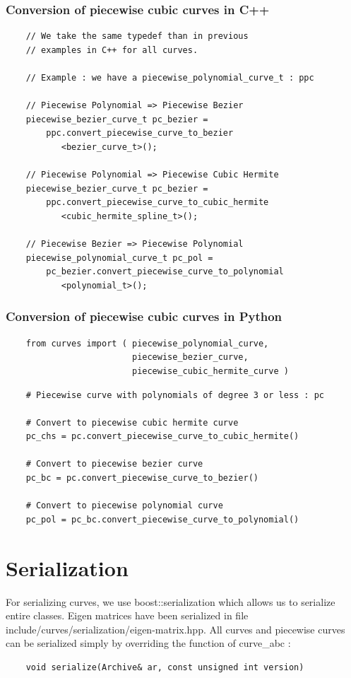 \documentclass{article}
\begin{document}
    \subsubsection{Conversion of piecewise cubic curves in C++}
    \begin{lstlisting}
    // We take the same typedef than in previous
    // examples in C++ for all curves.
    
    // Example : we have a piecewise_polynomial_curve_t : ppc
    
    // Piecewise Polynomial => Piecewise Bezier
    piecewise_bezier_curve_t pc_bezier = 
        ppc.convert_piecewise_curve_to_bezier
           <bezier_curve_t>();
    
    // Piecewise Polynomial => Piecewise Cubic Hermite
    piecewise_bezier_curve_t pc_bezier = 
        ppc.convert_piecewise_curve_to_cubic_hermite
           <cubic_hermite_spline_t>();
        
    // Piecewise Bezier => Piecewise Polynomial
    piecewise_polynomial_curve_t pc_pol = 
        pc_bezier.convert_piecewise_curve_to_polynomial
           <polynomial_t>();
    \end{lstlisting}
    
    \subsubsection{Conversion of piecewise cubic curves in Python}
    \begin{lstlisting}
    from curves import ( piecewise_polynomial_curve, 
                         piecewise_bezier_curve,
                         piecewise_cubic_hermite_curve )
    \end{lstlisting}
    \begin{lstlisting}
    # Piecewise curve with polynomials of degree 3 or less : pc
    
    # Convert to piecewise cubic hermite curve
    pc_chs = pc.convert_piecewise_curve_to_cubic_hermite()
    
    # Convert to piecewise bezier curve
    pc_bc = pc.convert_piecewise_curve_to_bezier()
    
    # Convert to piecewise polynomial curve
    pc_pol = pc_bc.convert_piecewise_curve_to_polynomial()
    \end{lstlisting}
    
\section{Serialization}
    For serializing curves, we use boost::serialization which allows us to serialize entire classes. Eigen matrices have been serialized in file include/curves/serialization/eigen-matrix.hpp.
    All curves and piecewise curves can be serialized simply by overriding the function of curve\_abc :
    \begin{lstlisting}
    void serialize(Archive& ar, const unsigned int version)
    \end{lstlisting}
    
\end{document}
